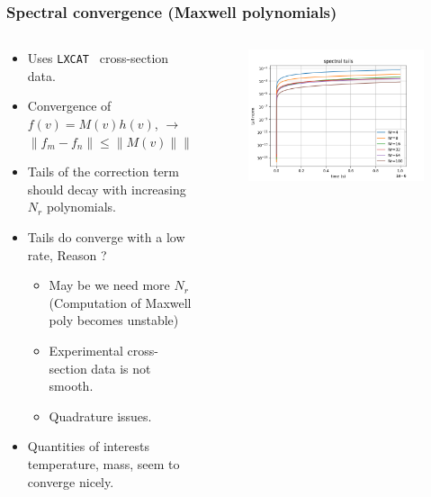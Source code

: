 \documentclass[mathserif, aspectratio=169]{beamer}
\newcommand{\norm}[1]{\left\lVert#1\right\rVert}
\newcommand{\lxcat}{\texttt{LXCAT}}
\begin{document}
	\begin{frame}
		\frametitle{Spectral convergence (Maxwell polynomials)}
		\begin{columns}
			\begin{column}{0.48\textwidth}
				\begin{itemize}
					\item Uses \lxcat~ cross-section data. 
					\item Convergence of $f(v) = M(v) h(v)$,  $\rightarrow$ $\norm{f_{m}- f_{n}} \leq \norm{M(v)} \norm{h_m-h_n}$
					\item Tails of the correction term should decay with increasing $N_r$ polynomials.
					\item Tails do converge with a low rate, Reason ?%
					\begin{itemize}
						\item May be we need more $N_r$ (Computation of Maxwell poly becomes unstable)
						\item Experimental cross-section data is not smooth. 
						\item Quadrature issues.
					\end{itemize}
					\item Quantities of interests temperature, mass, seem to converge nicely. 
				\end{itemize}
			\end{column}
			\begin{column}{0.48\textwidth}
				\begin{figure}
					\centering
					\includegraphics[width=\textwidth]{g0_mw_tails.png}
				\end{figure}
			\end{column}
		\end{columns}
	\end{frame}
\end{document}

